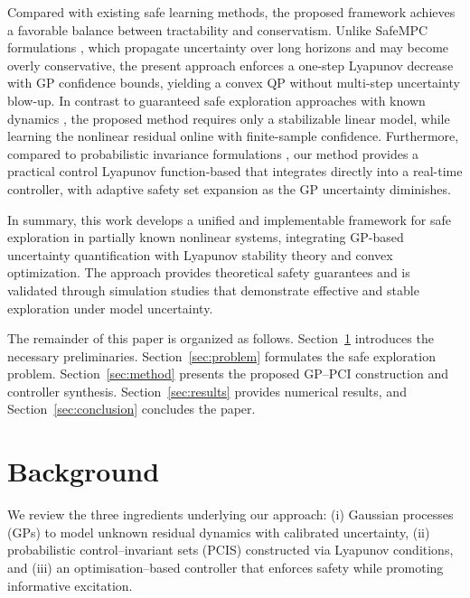 \documentclass[10pt]{article}
\newcommand{\1}{\mathbbm{1}}
\begin{document}
Compared with existing safe learning methods, the proposed framework achieves a favorable balance between tractability and conservatism. Unlike SafeMPC formulations \citep{Koller2018SafeMPC}, which propagate uncertainty over long horizons and may become overly conservative, the present approach enforces a one-step Lyapunov decrease with GP confidence bounds, yielding a convex QP without multi-step uncertainty blow-up. In contrast to guaranteed safe exploration approaches with known dynamics \citep{Prajapat2024}, the proposed method requires only a stabilizable linear model, while learning the nonlinear residual online with finite-sample confidence. Furthermore, compared to probabilistic invariance formulations \citep{Gao2021PCIS,Griffioen2023}, our method provides a practical control Lyapunov function-based that integrates directly into a real-time controller, with adaptive safety set expansion as the GP uncertainty diminishes.

In summary, this work develops a unified and implementable framework for safe exploration in partially known nonlinear systems, integrating GP-based uncertainty quantification with Lyapunov stability theory and convex optimization. The approach provides theoretical safety guarantees and is validated through simulation studies that demonstrate effective and stable exploration under model uncertainty.

The remainder of this paper is organized as follows. Section~\ref{sec:background} introduces the necessary preliminaries. Section~\ref{sec:problem} formulates the safe exploration problem. Section~\ref{sec:method} presents the proposed GP–PCI construction and controller synthesis. Section~\ref{sec:results} provides numerical results, and Section~\ref{sec:conclusion} concludes the paper.

\section{Background}\label{sec:background}
We review the three ingredients underlying our approach:
(i) Gaussian processes (GPs) to model unknown residual dynamics with calibrated uncertainty,
(ii) probabilistic control–invariant sets (PCIS) constructed via Lyapunov conditions, and
(iii) an optimisation–based controller that enforces safety while promoting informative excitation.
\end{document}
